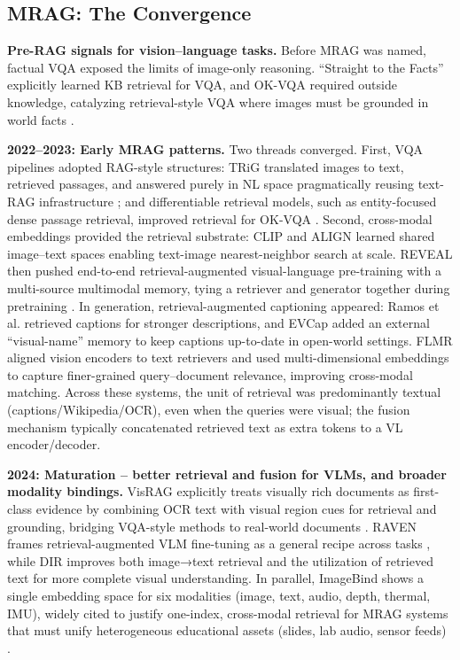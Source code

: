 \subsection{MRAG: The Convergence}
\textbf{Pre-RAG signals for vision–language tasks.}  
Before MRAG was named, factual VQA exposed the limits of image-only reasoning. “Straight to the Facts” explicitly learned KB retrieval for VQA, and OK-VQA required outside knowledge, catalyzing retrieval-style VQA where images must be grounded in world facts \cite{marino2019okvqa}.

\textbf{2022–2023: Early MRAG patterns.}  
Two threads converged. First, VQA pipelines adopted RAG-style structures: TRiG translated images to text, retrieved passages, and answered purely in NL space pragmatically reusing text-RAG infrastructure \cite{gao2022trig}; and differentiable retrieval models, such as entity-focused dense passage retrieval, improved retrieval for OK-VQA \cite{wu2022entityvqa}. Second, cross-modal embeddings provided the retrieval substrate: CLIP and ALIGN learned shared image–text spaces enabling text-image nearest-neighbor search at scale. REVEAL then pushed end-to-end retrieval-augmented visual-language pre-training with a multi-source multimodal memory, tying a retriever and generator together during pretraining \cite{hu2023reveal}. In generation, retrieval-augmented captioning appeared: Ramos et al. retrieved captions for stronger descriptions, and EVCap added an external “visual-name” memory to keep captions up-to-date in open-world settings. FLMR aligned vision encoders to text retrievers and used multi-dimensional embeddings to capture finer-grained query–document relevance, improving cross-modal matching. Across these systems, the unit of retrieval was predominantly textual (captions/Wikipedia/OCR), even when the queries were visual; the fusion mechanism typically concatenated retrieved text as extra tokens to a VL encoder/decoder.

\textbf{2024: Maturation – better retrieval and fusion for VLMs, and broader modality bindings.}  
VisRAG explicitly treats visually rich documents as first-class evidence by combining OCR text with visual region cues for retrieval and grounding, bridging VQA-style methods to real-world documents \cite{yu2024visrag}. RAVEN frames retrieval-augmented VLM fine-tuning as a general recipe across tasks \cite{rao2024raven}, while DIR improves both image→text retrieval and the utilization of retrieved text for more complete visual understanding. In parallel, ImageBind shows a single embedding space for six modalities (image, text, audio, depth, thermal, IMU), widely cited to justify one-index, cross-modal retrieval for MRAG systems that must unify heterogeneous educational assets (slides, lab audio, sensor feeds) \cite{girdhar2023imagebind}.

